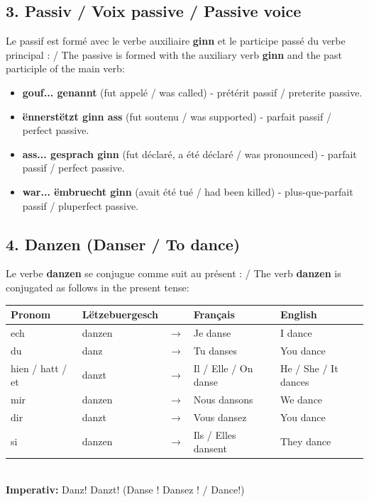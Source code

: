 \subsection*{3. Passiv / Voix passive / Passive voice}
Le passif est formé avec le verbe auxiliaire \textbf{ginn} et le participe passé du verbe principal : / The passive is formed with the auxiliary verb \textbf{ginn} and the past participle of the main verb:
\begin{itemize}
    \item \textbf{gouf... genannt} (fut appelé / was called) - prétérit passif / preterite passive.
    \item \textbf{ënnerstëtzt ginn ass} (fut soutenu / was supported) - parfait passif / perfect passive.
    \item \textbf{ass... gesprach ginn} (fut déclaré, a été déclaré / was pronounced) - parfait passif / perfect passive.
    \item \textbf{war... ëmbruecht ginn} (avait été tué / had been killed) - plus-que-parfait passif / pluperfect passive.
\end{itemize}

\subsection*{4. Danzen (Danser / To dance)}
Le verbe \textbf{danzen} se conjugue comme suit au présent : / The verb \textbf{danzen} is conjugated as follows in the present tense:

\noindent
\begin{tabular}{ll c l l}
    \toprule
    \textbf{Pronom} & \textbf{Lëtzebuergesch} & \textbf{} & \textbf{Français} & \textbf{English} \\
    \midrule
    ech & danzen & $\rightarrow$ & Je danse & I dance \\
    du & danz & $\rightarrow$ & Tu danses & You dance \\
    hien / hatt / et & danzt & $\rightarrow$ & Il / Elle / On danse & He / She / It dances \\
    \midrule
    mir & danzen & $\rightarrow$ & Nous dansons & We dance \\
    dir & danzt & $\rightarrow$ & Vous dansez & You dance \\
    si & danzen & $\rightarrow$ & Ils / Elles dansent & They dance \\
    \bottomrule
\end{tabular}
\\[1em]
\textbf{Imperativ:} Danz! Danzt! (Danse ! Dansez ! / Dance!)

